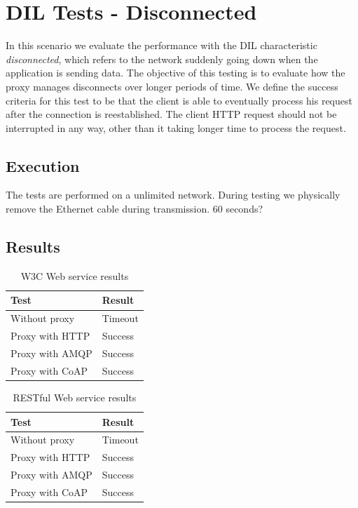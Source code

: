 \section{DIL Tests - Disconnected}

In this scenario we evaluate  the performance with the DIL characteristic
\textit{disconnected}, which refers to the network suddenly going down when the
application is sending data. The objective of this testing is to evaluate how
the proxy manages disconnects over longer periods of time. We define the success
criteria for this test to be that the client is able to eventually process his
request after the connection is reestablished. The client HTTP request should
not be interrupted in any way, other than it taking longer time to process the
request.

\subsection{Execution}

 The tests are performed on a unlimited network. During testing we physically
 remove the Ethernet cable during transmission. 60 seconds?

\subsection{Results}

\begin{table}[h!]
\begin{tabular}{| l | l |}
\hline
  \textbf{Test} & \textbf{Result} \\ \hline
  Without proxy & Timeout \\ \hline
  Proxy with HTTP & Success \\ \hline
  Proxy with AMQP & Success \\ \hline
  Proxy with CoAP & Success \\ \hline
\end{tabular}
\caption{W3C Web service results}
\end{table}

\begin{table}[h!]
\begin{tabular}{| l | l |}
\hline
  \textbf{Test} & \textbf{Result} \\ \hline
  Without proxy & Timeout \\ \hline
  Proxy with HTTP & Success \\ \hline
  Proxy with AMQP & Success \\ \hline
  Proxy with CoAP & Success \\ \hline
\end{tabular}
\caption{RESTful Web service results}
\end{table}

